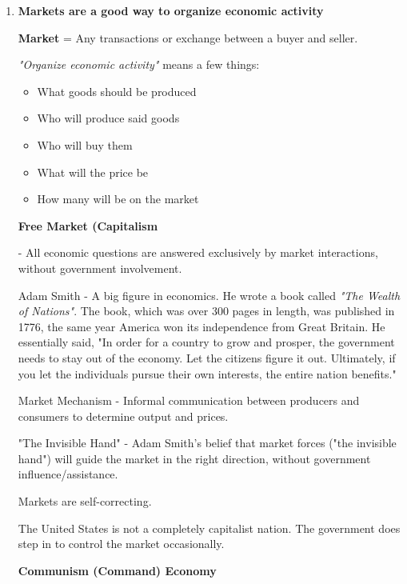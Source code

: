 \documentclass{article}
\begin{document}
\begin{enumerate}
{    - Better quality of goods available

    - Lowered cost to consumers

    - Greater market share for firms}

    \item{\textbf{Markets are a good way to organize economic activity}

    \textbf{Market} = Any transactions or exchange between a buyer and seller.

    \textit{"Organize economic activity"} means a few things:

    \begin{itemize}
        \item What goods should be produced
        \item Who will produce said goods
        \item Who will buy them
        \item What will the price be
        \item How many will be on the market
    \end{itemize}

    \textbf{Free Market (Capitalism}

    - All economic questions are answered exclusively by market interactions, without government involvement.

    Adam Smith - A big figure in economics. He wrote a book called \textit{"The Wealth of Nations"}. The book, which was over 300 pages in length, was published in 1776, the same year America won its independence from Great Britain. He essentially said, "In order for a country to grow and prosper, the government needs to stay out of the economy. Let the citizens figure it out. Ultimately, if you let the individuals pursue their own interests, the entire nation benefits."

    Market Mechanism -  Informal communication between producers and consumers to determine output and prices.

    "The Invisible Hand" - Adam Smith's belief that market forces ("the invisible hand") will guide the market in the right direction, without government influence/assistance.

    Markets are self-correcting.

    The United States is not a completely capitalist nation. The government does step in to control the market occasionally.

    \textbf{Communism (Command) Economy}

}
\end{enumerate}
\end{document}
